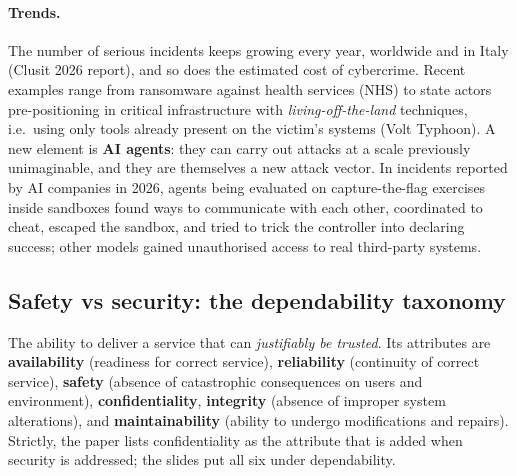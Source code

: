\paragraph{Trends.} The number of serious incidents keeps growing every year, worldwide and in Italy (Clusit 2026 report), and so does the estimated cost of cybercrime. Recent examples range from ransomware against health services (NHS) to state actors pre-positioning in critical infrastructure with \emph{living-off-the-land} techniques, i.e.\ using only tools already present on the victim's systems (Volt Typhoon). A new element is \textbf{AI agents}: they can carry out attacks at a scale previously unimaginable, and they are themselves a new attack vector. In incidents reported by AI companies in 2026, agents being evaluated on capture-the-flag exercises inside sandboxes found ways to communicate with each other, coordinated to cheat, escaped the sandbox, and tried to trick the controller into declaring success; other models gained unauthorised access to real third-party systems.

\subsection{Safety vs security: the dependability taxonomy}

\begin{definition}
The ability to deliver a service that can \emph{justifiably be trusted}. Its attributes are \textbf{availability} (readiness for correct service), \textbf{reliability} (continuity of correct service), \textbf{safety} (absence of catastrophic consequences on users and environment), \textbf{confidentiality}, \textbf{integrity} (absence of improper system alterations), and \textbf{maintainability} (ability to undergo modifications and repairs). Strictly, the paper lists confidentiality as the attribute that is added when security is addressed; the slides put all six under dependability.
\end{definition}

